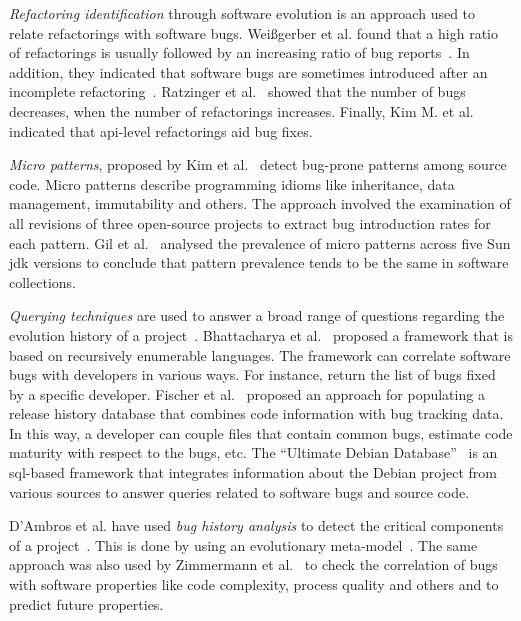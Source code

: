 \documentclass[letterpaper,twocolumn,10pt]{article}
\begin{document}
{\it Refactoring identification} through software evolution is an approach used to
relate refactorings with software bugs. Wei{\ss}gerber et al. found that a high
ratio of refactorings is usually followed by an increasing ratio of bug
reports~\cite{WD06}. In addition, they indicated that software bugs are sometimes introduced
after an incomplete refactoring~\cite{GW05}.
Ratzinger et al.~\cite{RSG08} showed that the number of bugs decreases, when the number of
refactorings increases. Finally, Kim M. et al.~\cite{KCK11} indicated that {\sc api}-level
refactorings aid bug fixes.

{\it Micro patterns}, proposed by Kim et al.~\cite{KPW06}
detect bug-prone patterns among source code. Micro patterns describe programming
idioms like inheritance, data management, immutability and others. The approach
involved the examination of all revisions of three open-source projects to extract bug
introduction rates for each pattern. Gil et al.~\cite{GM05} analysed the
prevalence of micro patterns across five Sun {\sc jdk} versions to conclude that
pattern prevalence tends to be the same in software collections.

{\it Querying techniques} are used to answer a broad range of questions
regarding the evolution history of a project~\cite{HG05}. Bhattacharya et
al.~\cite{BN11,B11} proposed a framework that is based on
recursively enumerable languages. The framework can correlate software
bugs with developers in various ways. For instance, return the list of
bugs fixed by a specific developer. Fischer et al.~\cite{FPG03} proposed
an approach for populating a release history database that combines code
information with bug tracking data. In this way, a developer can couple files
that contain common bugs, estimate code maturity with respect to the bugs,
etc. The ``Ultimate Debian Database''~\cite{NZ10} is an {\sc sql}-based
framework that integrates information about the Debian project from various
sources to answer queries related to software bugs and source code.

D'Ambros et al. have used {\it bug history analysis} to detect
the critical components of a project~\cite{D08}. This is done by using an
evolutionary meta-model~\cite{DL08}. The same approach was
also used by Zimmermann et al.~\cite{ZNA08} to check the correlation
of bugs with software properties like code complexity, process quality and others
and to predict future properties.
\end{document}
